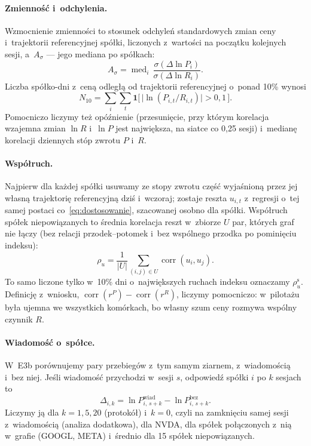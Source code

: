 \documentclass[11pt,a4paper]{article}
\begin{document}
\paragraph{Zmienność i~odchylenia.} Wzmocnienie zmienności to stosunek odchyleń standardowych zmian ceny i~trajektorii
referencyjnej spółki, liczonych z~wartości na początku kolejnych sesji, a~$A_\sigma$ --- jego mediana po spółkach:
\begin{equation}
  A_\sigma = \operatorname{med}_i\, \frac{\sigma(\Delta \ln P_i)}{\sigma(\Delta \ln R_i)}.
\end{equation}
Liczba spółko-dni z~ceną odległą od trajektorii referencyjnej o~ponad 10\% wynosi
\begin{equation}
  N_{10} = \sum_{i}\sum_{t} \mathbf{1}\bigl[\,\bigl|\ln (P_{i,t} / R_{i,t})\bigr| > 0{,}1\,\bigr].
\end{equation}
Pomocniczo liczymy też opóźnienie (przesunięcie, przy którym korelacja wzajemna zmian $\ln R$ i~$\ln P$ jest
największa, na siatce co 0,25 sesji) i~medianę korelacji dziennych stóp zwrotu $P$ i~$R$.

\paragraph{Współruch.} Najpierw dla każdej spółki usuwamy ze stopy zwrotu część wyjaśnioną przez jej własną
trajektorię referencyjną dziś i~wczoraj; zostaje reszta $u_{i,t}$ z~regresji o~tej samej postaci co~\eqref{eq:dostosowanie}, szacowanej osobno dla spółki. Współruch spółek
niepowiązanych to średnia korelacja reszt w~zbiorze $U$ par, których graf nie łączy (bez relacji przodek--potomek
i~bez wspólnego przodka po pominięciu indeksu):
\begin{equation}
  \rho_u = \frac{1}{|U|} \sum_{(i,j) \in U} \operatorname{corr}(u_i, u_j).
\end{equation}
To samo liczone tylko w~10\% dni o~największych ruchach indeksu oznaczamy $\rho_u^{\mathrm{s}}$. Definicję z~wniosku,
$\operatorname{corr}(r^P) - \operatorname{corr}(r^R)$, liczymy pomocniczo: w~pilotażu była ujemna we wszystkich
komórkach, bo własny szum ceny rozmywa wspólny czynnik $R$.

\paragraph{Wiadomość o~spółce.} W~E3b porównujemy pary przebiegów z~tym samym ziarnem, z~wiadomością i~bez niej.
Jeśli wiadomość przychodzi w~sesji $s$, odpowiedź spółki $i$ po $k$ sesjach to
\begin{equation}
  \Delta_{i,k} = \ln P^{\text{wiad}}_{i,\,s+k} - \ln P^{\text{bez}}_{i,\,s+k}.
\end{equation}
Liczymy ją dla $k = 1, 5, 20$ (protokół) i~$k = 0$, czyli na zamknięciu samej sesji z~wiadomością (analiza
dodatkowa), dla NVDA, dla spółek połączonych z~nią w~grafie (GOOGL, META) i~średnio dla 15 spółek niepowiązanych.
\end{document}
